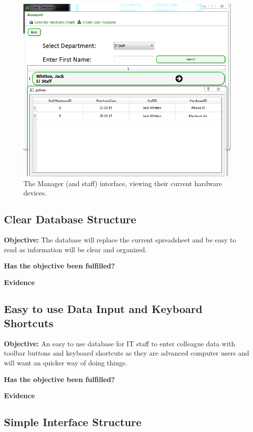 \begin{figure}[H]
    \includegraphics[width=\textwidth]{./Evaluation/Images/database3.png}
    \caption{The Manager (and staff) interface, viewing their current hardware devices.} \label{fig:db3}
\end{figure}

\subsection{Clear Database Structure}

\textbf{Objective:} The database will replace the current spreadsheet and be easy to read as information will be clear and organized.

\textbf{Has the objective been fulfilled?}

\textbf{Evidence}


\subsection{Easy to use Data Input and Keyboard Shortcuts}

\textbf{Objective:} An easy to use database for IT staff to enter colleague data with toolbar buttons and keyboard shortcuts as they are advanced computer users and will want an quicker way of doing things.

\textbf{Has the objective been fulfilled?}

\textbf{Evidence}


\subsection{Simple Interface Structure}

